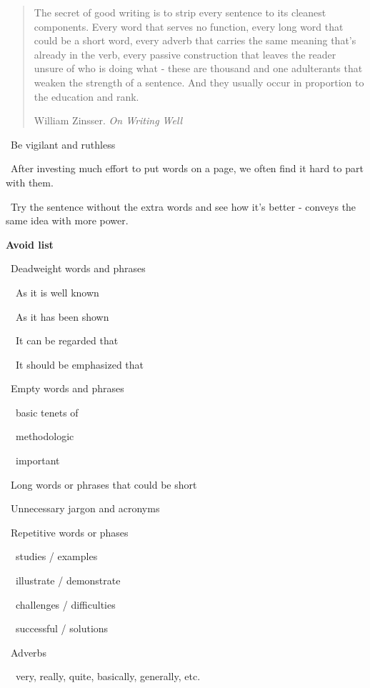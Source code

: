 \documentclass[a4paper, 12pt]{article}
\begin{document}
\vspace{4pt}\begin{quote}
The secret of good writing is to strip every sentence to its cleanest components. 
Every word that serves no function, every long word that could be a short word, 
every adverb that carries the same meaning that's already in the verb, 
every passive construction that leaves the reader unsure of who is doing what
- these are thousand and one adulterants that weaken the strength of a sentence. 
And they usually occur in proportion to the education and rank. 
\begin{flushright}
William Zinsser. \textit{On Writing Well}
\end{flushright}
\end{quote}

\par\textbullet\ Be vigilant and ruthless

\par\textbullet\ After investing much effort to put words on a page, we often find it hard to part with them.

\par\textbullet\ Try the sentence without the extra words and see how it's better - conveys the same idea with more power.

\par\textbf{Avoid list}
\par\textbullet\ Deadweight words and phrases
\par\ \textopenbullet\ As it is well known
\par\ \textopenbullet\ As it has been shown
\par\ \textopenbullet\ It can be regarded that
\par\ \textopenbullet\ It should be emphasized that
\par\textbullet\ Empty words and phrases
\par\ \textopenbullet\ basic tenets of
\par\ \textopenbullet\ methodologic
\par\ \textopenbullet\ important
\par\textbullet\ Long words or phrases that could be short
\par\textbullet\ Unnecessary jargon and acronyms
\par\textbullet\ Repetitive words or phases
\par\ \textopenbullet\ studies / examples
\par\ \textopenbullet\ illustrate / demonstrate
\par\ \textopenbullet\ challenges / difficulties
\par\ \textopenbullet\ successful / solutions
\par\textbullet\ Adverbs
\par\ \textopenbullet\ very, really, quite, basically, generally, etc.
\end{document}
